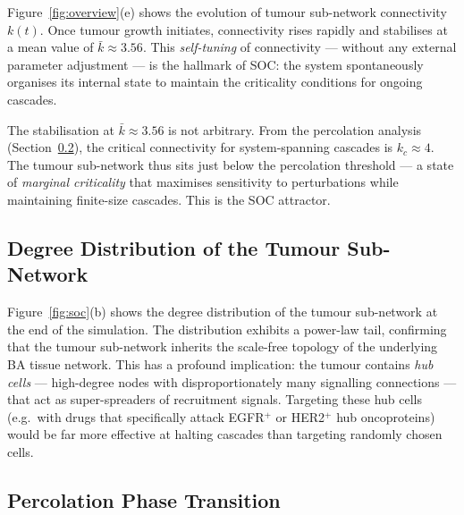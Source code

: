 \documentclass[12pt,a4paper]{article}
\begin{document}
Figure~\ref{fig:overview}(e) shows the evolution of tumour sub-network
connectivity $k(t)$.  Once tumour growth initiates, connectivity rises
rapidly and stabilises at a mean value of $\bar{k} \approx 3.56$.  This
\emph{self-tuning} of connectivity --- without any external parameter adjustment
--- is the hallmark of SOC: the system spontaneously organises its internal
state to maintain the criticality conditions for ongoing cascades.

The stabilisation at $\bar{k} \approx 3.56$ is not arbitrary.  From the
percolation analysis (Section~\ref{sec:perc}), the critical connectivity
for system-spanning cascades is $k_c \approx 4$.  The tumour sub-network thus
sits just below the percolation threshold --- a state of \emph{marginal
criticality} that maximises sensitivity to perturbations while maintaining
finite-size cascades.  This is the SOC attractor.

\subsection{Degree Distribution of the Tumour Sub-Network}

Figure~\ref{fig:soc}(b) shows the degree distribution of the tumour
sub-network at the end of the simulation.  The distribution exhibits a
power-law tail, confirming that the tumour sub-network inherits the scale-free
topology of the underlying BA tissue network.  This has a profound implication:
the tumour contains \emph{hub cells} --- high-degree nodes with
disproportionately many signalling connections --- that act as super-spreaders
of recruitment signals.  Targeting these hub cells (e.g.\ with drugs that
specifically attack EGFR$^+$ or HER2$^+$ hub oncoproteins) would be far more
effective at halting cascades than targeting randomly chosen cells.

\subsection{Percolation Phase Transition}
\label{sec:perc}
\end{document}
